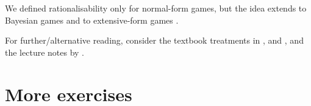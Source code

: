 We defined rationalisability only for normal-form games, but the idea extends to Bayesian games \parencite[see][]{DekelFudenbergMorris2007} and to extensive-form games \parencite[e.g.][]{Pearce1984,Battigalli1997,Battigalli2003,BattigalliSiniscalchi2003}.

For further/alternative reading, consider the textbook treatments in \textcite[chapter~4]{OsborneRubinstein1994}, \textcite[chapter~2]{FudenbergTirole1991} and \textcite[sections~1.8--1.9, 2.5 and 3.1]{Myerson1991}, and the lecture notes by \textcite{Salcedo2020}.



\section{More exercises}
\label{dom:exer}

